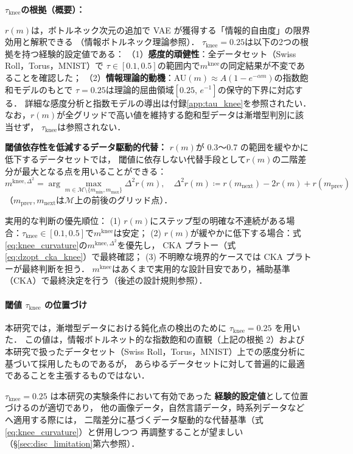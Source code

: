 \documentclass[12pt,a4paper]{jsarticle}
\newcommand{\mknee}{m^{\mathrm{knee}}}      %
\begin{document}
\textbf{$\tau_{\mathrm{knee}}$の根拠（概要）：}

$r(m)$は，ボトルネック次元の追加で VAE が獲得する「情報的自由度」の限界効用と解釈できる
（情報ボトルネック理論\cite{tishby2000ib}参照）．
$\tau_{\mathrm{knee}} = 0.25$は以下の2つの根拠を持つ経験的設定値である：
（1）\textbf{感度的頑健性}：全データセット（Swiss Roll，Torus，MNIST）で
$\tau \in [0.1, 0.5]$の範囲内で$\mknee$の同定結果が不変であることを確認した；
（2）\textbf{情報理論的動機}：AU$(m) \approx A(1-e^{-\alpha m})$の指数飽和モデルのもとで
$\tau = 0.25$は理論的屈曲領域$[0.25,\, e^{-1}]$の保守的下界に対応する．
詳細な感度分析と指数モデルの導出は付録\ref{app:tau_knee}を参照されたい．
なお，$r(m)$が全グリッドで高い値を維持する飽和型データは漸増型判別に該当せず，
$\tau_{\mathrm{knee}}$は参照されない．

\textbf{閾値依存性を低減するデータ駆動的代替：}
$r(m)$が 0.3〜0.7 の範囲を緩やかに低下するデータセットでは，
閾値に依存しない代替手段として$r(m)$の二階差分が最大となる点を用いることができる：
\begin{equation}
  m^{\mathrm{knee},\Delta^2} = \arg\max_{m \in \mathcal{M} \setminus \{m_{\min}, m_{\max}\}}
  \Delta^2 r(m), \quad
  \Delta^2 r(m) \coloneqq r(m_{\mathrm{next}}) - 2r(m) + r(m_{\mathrm{prev}})
  \label{eq:knee_curvature}
\end{equation}
（$m_{\mathrm{prev}}, m_{\mathrm{next}}$は$\mathcal{M}$上の前後のグリッド点）．

実用的な判断の優先順位：
(1) $r(m)$にステップ型の明確な不連続がある場合：$\tau_{\mathrm{knee}} \in [0.1, 0.5]$で$\mknee$は安定；
(2) $r(m)$が緩やかに低下する場合：式\eqref{eq:knee_curvature}の$m^{\mathrm{knee},\Delta^2}$を優先し，
CKA プラトー（式\eqref{eq:dzopt_cka_knee}）で最終確認；
(3) 不明瞭な境界的ケースでは CKA プラトーが最終判断を担う．
$\mknee$はあくまで実用的な設計目安であり，補助基準（CKA）で最終決定を行う（後述の設計規則参照）．

\paragraph{閾値 $\tau_{\mathrm{knee}}$ の位置づけ}
本研究では，漸増型データにおける鈍化点の検出のために $\tau_{\mathrm{knee}}=0.25$ を用いた．
この値は，情報ボトルネット的な指数飽和の直観（上記の根拠 2）および
本研究で扱ったデータセット（Swiss Roll，Torus，MNIST）上での感度分析に基づいて採用したものであるが，
あらゆるデータセットに対して普遍的に最適であることを主張するものではない．

$\tau_{\mathrm{knee}}=0.25$ は本研究の実験条件において有効であった
\textbf{経験的設定値}として位置づけるのが適切であり，
他の画像データ，自然言語データ，時系列データなどへ適用する際には，
二階差分に基づくデータ駆動的な代替基準（式\eqref{eq:knee_curvature}）と併用しつつ
再調整することが望ましい（§\ref{sec:disc_limitation}第六参照）．
\end{document}
